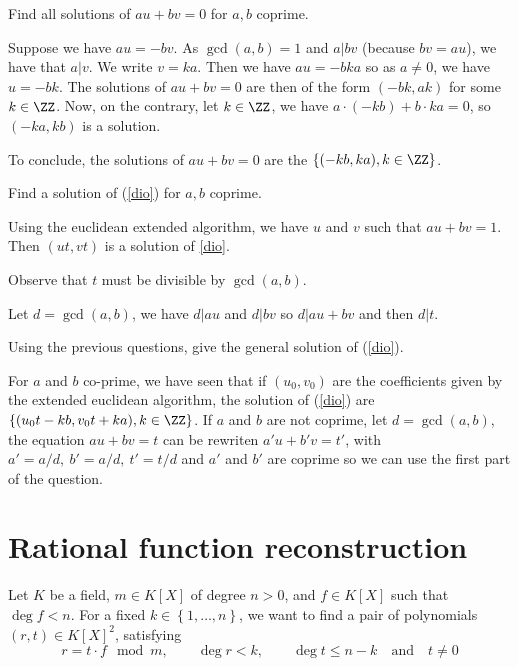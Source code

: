 \documentclass[11pt]{exam}
\theoremstyle{definition}
\begin{document}
{\begin{questions}
	\question Find all solutions of $au + bv = 0$ for $a,b$ coprime.
	\begin{solution}
		Suppose we have $au = -bv$. As $\gcd(a,b) = 1$ and $a | bv$ (because $bv = au$), we have that $a | v$. We write $v = ka$. Then we have $au = -bka$ so as $a \neq 0$, we have $u = -bk$. The solutions of $au + bv = 0$ are then of the form $(-bk, ak)$ for some $k \in \ZZ$. Now, on the contrary, let $k \in \ZZ$, we have $a \cdot (-kb) + b \cdot ka = 0$, so $(-ka, kb)$ is a solution.
		
		To conclude, the solutions of $au + bv = 0$ are the $\{(-kb, ka), k \in \ZZ \}$.
	\end{solution}
	
	\question Find a solution of (\ref{dio}) for $a,b$ coprime. 
	
	\begin{solution}
		Using the euclidean extended algorithm, we have $u$ and $v$ such that $au + bv = 1$. Then $(ut, vt)$ is a solution of \ref{dio}.
	\end{solution}
	
	\question Observe that $t$ must be divisible by $\gcd(a,b)$.
	
	\begin{solution}
		Let $d = \gcd(a,b)$, we have $d | au$ and $d | bv$ so $d | au+bv$ and then $d | t$.
	\end{solution}
	
	\question Using the previous questions, give the general solution of (\ref{dio}).
	
	\begin{solution}
		For $a$ and $b$ co-prime, we have seen that if $(u_0, v_0)$ are the coefficients given by the extended euclidean algorithm, the solution of (\ref{dio}) are $\{ (u_0t-kb, v_0t+ka), k \in \ZZ \}$.
		If $a$ and $b$ are not coprime, let $d = \gcd(a,b)$, the equation $au + bv = t$ can be rewriten $a'u + b'v = t'$, with $a' = a/d, \ b' = a/d, \ t' = t/d$ and $a'$ and $b'$ are coprime so we can use the first part of the question.
	\end{solution}
	
\end{questions}

\section{Rational function reconstruction}

Let $K$ be a field, $m\in K[X]$ of degree $n>0$, and $f\in K[X]$ such that $\deg f<n$. For a fixed $k\in\left\lbrace 1,\ldots,n\right\rbrace$, we want to find a pair of polynomials $(r,t)\in K[X]^2$, satisfying
\begin{equation}\label{ARR}
r = t\cdot f\mod m,\qquad\deg r <k,\qquad\deg t \leqslant n-k \quad \text{and} \quad t \neq 0
\end{equation}

}
\end{document}
